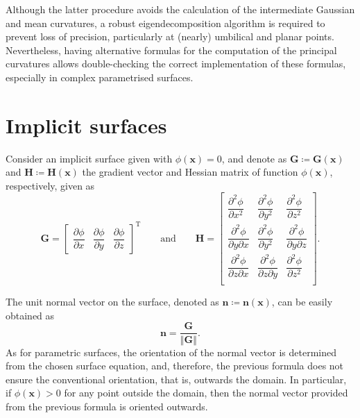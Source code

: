 Although the latter procedure avoids the calculation of the intermediate Gaussian and mean curvatures, a robust eigendecomposition algorithm is required to prevent loss of precision, particularly at (nearly) umbilical and planar points.
Nevertheless, having alternative formulas for the computation of the principal curvatures allows double-checking the correct implementation of these formulas, especially in complex parametrised surfaces.

\section{Implicit surfaces}
\label{subsubsec:appendix_implicit_surfaces}

Consider an implicit surface given with $\phi\left(\bm{x}\right)=0$, and denote as $\bm{G}\coloneqq\bm{G}\left(\bm{x}\right)$ and $\bm{H}\coloneqq\bm{H}\left(\bm{x}\right)$ the gradient vector and Hessian matrix of function $\phi\left(\bm{x}\right)$, respectively, given as
\begin{equation}
\bm{G}
=
\begin{bmatrix}
\dfrac{\partial\phi}{\partial x} & \dfrac{\partial\phi}{\partial y} & \dfrac{\partial\phi}{\partial z}
\end{bmatrix}^{\textrm{T}}
\qquad
\textrm{and}
\qquad
\bm{H}
=
\begin{bmatrix}
\dfrac{\partial^{2}\phi}{\partial x^{2}} & \dfrac{\partial^{2}\phi}{\partial y^{2}} & \dfrac{\partial^{2}\phi}{\partial z^{2}}\\
\dfrac{\partial^{2}\phi}{\partial y\partial x} & \dfrac{\partial^{2}\phi}{\partial y^{2}} & \dfrac{\partial^{2}\phi}{\partial y\partial z}\\
\dfrac{\partial^{2}\phi}{\partial z\partial x} & \dfrac{\partial^{2}\phi}{\partial z\partial y} & \dfrac{\partial^{2}\phi}{\partial z^{2}}\\
\end{bmatrix}.
\end{equation}

The unit normal vector on the surface, denoted as $\bm{n}\coloneqq\bm{n}\left(\bm{x}\right)$, can be easily obtained as
\begin{equation}
\bm{n}=\dfrac{\bm{G}}{\left\Vert\bm{G}\right\Vert}.
\end{equation}
As for parametric surfaces, the orientation of the normal vector is determined from the chosen surface equation, and, therefore, the previous formula does not ensure the conventional orientation, that is, outwards the domain.
In particular, if $\phi\left(\bm{x}\right)>0$ for any point outside the domain, then the normal vector provided from the previous formula is oriented outwards.

